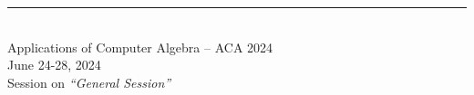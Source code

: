 \documentclass{article}
\newcommand{\HEADING}{
{\noindent \small Applications of Computer Algebra -- ACA 2024 \\
\small June 24-28, 2024\\
Session on \textit{``General Session''}}
\vspace{10pt}}
\begin{document}
	
\rule{\textwidth}{0.01 in}\\[-2em]
	
\HEADING	

\vspace{1cm}

\newtheorem{theorem}{Theorem}
\newtheorem{problem}[theorem]{Problem}
\newtheorem{notations}[theorem]{Notations}
\newtheorem{definition}[theorem]{Definition}
\newtheorem{example}[theorem]{Example}




\def\sf{\text{\itshape shift}}
\def\GCRD{\operatorname{gcrd}}
\def\gr{Gr\"{o}bner }
\def\V{{\mathbb{V}}}
\def\u{{u}}
\def\d{{d}}
\def\g{{\mathbf{g}}}
\def\f{{\mathbf{f}}}
\def\GCD{{\rm GCD}}
\def\F{{\mathbb{F}}}
\def\G{{\mathbf{G}}}
\def\z{{\mathbf{z}}}
\def\w{{\vec{w}}}
\def\h{{\mathbf{h}}}
\def\Syl{\operatorname{Syl}}
\def\PSyl{\operatorname{PSyl}}
\def\lc{\operatorname{lc}}
\def\lt{\operatorname{lt}}




\end{document}
